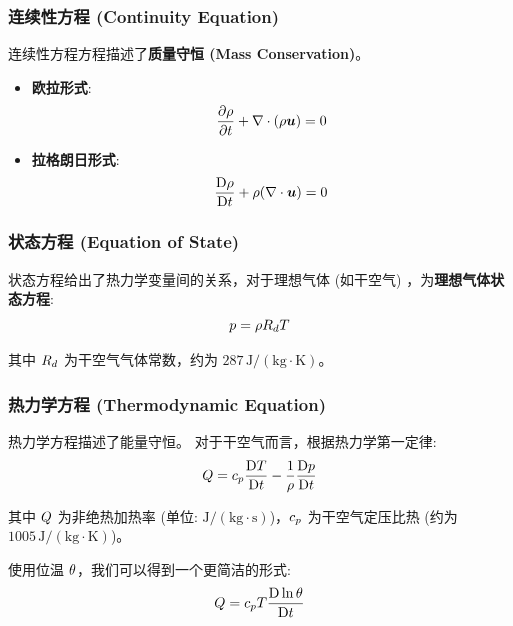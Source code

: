 \subsubsection{连续性方程 (Continuity Equation)}

连续性方程方程描述了\textbf{质量守恒 (Mass Conservation)}。
\begin{itemize}
    \item \textbf{欧拉形式}:
    \begin{equation}
        \pde{\density}{\timevar} + \nabla \cdot (\density \vel) = 0
        \label{eq:continuity_eulerian}
    \end{equation}

    \item \textbf{拉格朗日形式}:
    \begin{equation}
        \frac{\mathrm{D} \rho}{\mathrm{D} t} + \rho(\nabla \cdot \bm{u}) = 0
        \label{eq:continuity_lagrangian}
    \end{equation}
\end{itemize}

\subsubsection{状态方程 (Equation of State)}

状态方程给出了热力学变量间的关系，对于理想气体 (如干空气) ，为\textbf{理想气体状态方程}:
\begin{equation}
    p = \rho R_d T
    \label{eq:ideal_gas_law}
\end{equation}

其中 $R_d$ 为干空气气体常数，约为 $287\,\mathrm{J/(kg \cdot K)}$。

\subsubsection{热力学方程 (Thermodynamic Equation)}

热力学方程描述了能量守恒。
对于干空气而言，根据热力学第一定律:
\begin{equation}
    Q = c_p \frac{\mathrm{D} T}{\mathrm{D} t} - \frac{1}{\rho} \frac{\mathrm{D} p}{\mathrm{D} t}
    \label{eq:thermodynamic}
\end{equation}

其中 $Q$ 为非绝热加热率 (单位: $\mathrm{J/(kg \cdot s)}$)，$c_p$ 为干空气定压比热 (约为 $1005\,\mathrm{J/(kg \cdot K)}$)。

使用位温 $\theta$，我们可以得到一个更简洁的形式:
\begin{equation}
    Q = c_p T \frac{\mathrm{D} \ln\theta}{\mathrm{D} t}
    \label{eq:thermodynamic_ptemp}
\end{equation}

